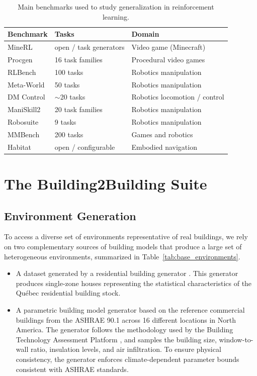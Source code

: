 \documentclass[10pt]{article} %
\begin{document}
\begin{table}
\centering
\caption{Main benchmarks used to study generalization in reinforcement learning.}
\begin{tabular}{l l l}
\hline
\textbf{Benchmark} & \textbf{Tasks} & \textbf{Domain} \\
\hline
MineRL \citep{guss2019} & open / task generators & Video game (Minecraft) \\
Procgen \citep{cobbe2020} & 16 task families & Procedural video games \\
RLBench \citep{stephen2020} & 100 tasks & Robotics manipulation \\
Meta-World \citep{mclean2025} & 50 tasks & Robotics manipulation \\
DM Control \citep{tunyasuvunakool2022} & $\sim$20 tasks & Robotics locomotion / control \\
ManiSkill2 \citep{gu2023} & 20 task families & Robotics manipulation \\
Robosuite \citep{yuke2020} & 9 tasks & Robotics manipulation \\
MMBench \citep{hansen2026} & 200 tasks & Games and robotics \\
Habitat \citep{szot2022} & open / configurable & Embodied navigation \\
\hline
\end{tabular}
\label{tab:rl_benchmarks}
\end{table}

\section{The Building2Building Suite}
\label{sec:B2B_suite}

\subsection{Environment Generation}

To access a diverse set of environments representative of real buildings, we rely on two complementary sources of building models that produce a large set of heterogeneous environments, summarized in Table~\ref{tab:base_environments}. 

\begin{itemize}
    \item A dataset generated by a residential building generator \citep{larochelle_martin2026}. This generator produces single-zone houses representing the statistical characteristics of the Québec residential building stock. 
    \item A parametric building model generator based on the reference commercial buildings from the ASHRAE 90.1 across 16 different locations in North America. The generator follows the methodology used by the Building Technology Assessment Platform \citep{btap2022}, and samples the building size, window-to-wall ratio, insulation levels, and air infiltration. To ensure physical consistency, the generator enforces climate-dependent parameter bounds consistent with ASHRAE standards.
\end{itemize}
\end{document}
